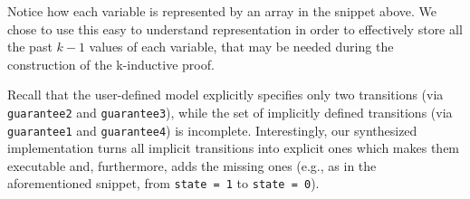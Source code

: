 Notice how each variable is represented by an array in the snippet above.
We chose to use this easy to understand representation in order to effectively
store all the past $k-1$ values of each variable, that may be needed during the
construction of the k-inductive proof.

Recall that the user-defined model explicitly specifies only two transitions
(via \texttt{guarantee2} and \texttt{guarantee3}), while the set of implicitly defined transitions (via \texttt{guarantee1} and \texttt{guarantee4}) is incomplete.
Interestingly, our synthesized implementation turns all implicit transitions
into explicit ones which makes them executable and, furthermore, adds the
missing ones (e.g., as in the aforementioned snippet, from \texttt{state = 1} to \texttt{state = 0}).
\fi
